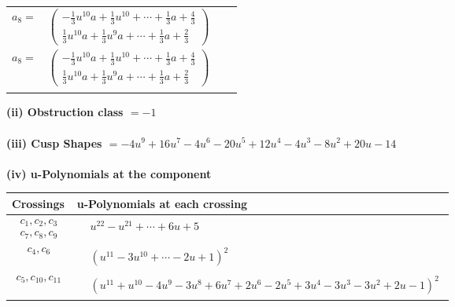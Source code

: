 \documentclass[1p]{elsarticle_modified}
\theoremstyle{definition}
\begin{document}
\begin{tabular}{m{7pt} m{180pt} m{7pt} m{180pt} }
\flushright $a_{8}=$&$\begin{pmatrix}-\frac{1}{3} u^{10} a+\frac{1}{3} u^{10}+\cdots+\frac{1}{3} a+\frac{4}{3}\\\frac{1}{3} u^{10} a+\frac{1}{3} u^9 a+\cdots+\frac{1}{3} a+\frac{2}{3}\end{pmatrix}$\\ \flushright $a_{8}=$&$\begin{pmatrix}-\frac{1}{3} u^{10} a+\frac{1}{3} u^{10}+\cdots+\frac{1}{3} a+\frac{4}{3}\\\frac{1}{3} u^{10} a+\frac{1}{3} u^9 a+\cdots+\frac{1}{3} a+\frac{2}{3}\end{pmatrix}$\\&\end{tabular}
\flushleft \textbf{(ii) Obstruction class $= -1$}\\~\\
\flushleft \textbf{(iii) Cusp Shapes $= -4 u^9+16 u^7-4 u^6-20 u^5+12 u^4-4 u^3-8 u^2+20 u-14$}\\~\\
\newpage\renewcommand{\arraystretch}{1}
\flushleft \textbf{(iv) u-Polynomials at the component}\newline \\
\begin{tabular}{m{50pt}|m{274pt}}
Crossings & \hspace{64pt}u-Polynomials at each crossing \\
\hline $$\begin{aligned}c_{1},c_{2},c_{3}\\c_{7},c_{8},c_{9}\end{aligned}$$&$\begin{aligned}
&u^{22}- u^{21}+\cdots+6 u+5
\end{aligned}$\\
\hline $$\begin{aligned}c_{4},c_{6}\end{aligned}$$&$\begin{aligned}
&(u^{11}-3 u^{10}+\cdots-2 u+1)^{2}
\end{aligned}$\\
\hline $$\begin{aligned}c_{5},c_{10},c_{11}\end{aligned}$$&$\begin{aligned}
&(u^{11}+u^{10}-4 u^9-3 u^8+6 u^7+2 u^6-2 u^5+3 u^4-3 u^3-3 u^2+2 u-1)^2
\end{aligned}$\\
\hline
\end{tabular}\\~\\
\end{document}
